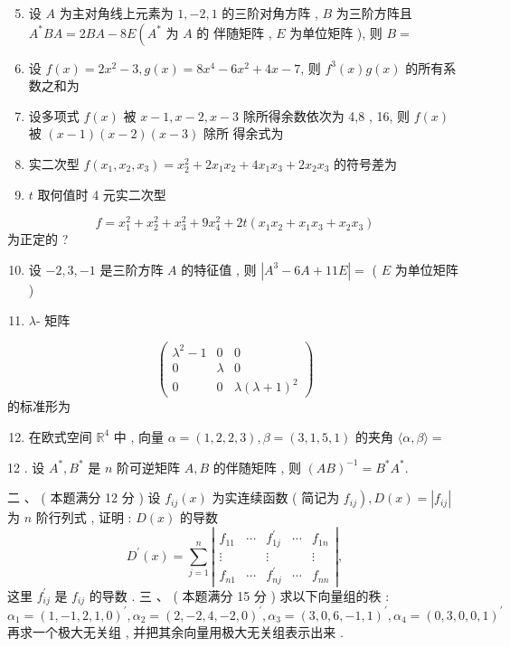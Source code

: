 \documentclass[10pt]{article}
\begin{document}
{\begin{enumerate}
  \setcounter{enumi}{4}
  \item  设  $A$  为主对角线上元素为  $1,-2,1$  的三阶对角方阵 , $B$  为三阶方阵且  $A^{*} B A=2 B A-8 E\left(A^{*}\right.$  为  $A$  的   伴随矩阵 , $E$  为单位矩阵 ),  则  $B=$

  \item  设  $f(x)=2 x^{2}-3, g(x)=8 x^{4}-6 x^{2}+4 x-7$,  则  $f^{3}(x) g(x)$  的所有系数之和为 

  \item  设多项式  $f(x)$  被  $x-1, x-2, x-3$  除所得余数依次为  4,8 , 16,  则  $f(x)$  被  $(x-1)(x-2)(x-3)$  除所   得余式为 

  \item  实二次型  $f\left(x_{1}, x_{2}, x_{3}\right)=x_{2}^{2}+2 x_{1} x_{2}+4 x_{1} x_{3}+2 x_{2} x_{3}$  的符号差为 

  \item $t$  取何值时  4  元实二次型 

\end{enumerate}
$$
f=x_{1}^{2}+x_{2}^{2}+x_{3}^{2}+9 x_{4}^{2}+2 t\left(x_{1} x_{2}+x_{1} x_{3}+x_{2} x_{3}\right)
$$
 为正定的 ?

\begin{enumerate}
  \setcounter{enumi}{9}
  \item  设  $-2,3,-1$  是三阶方阵  $A$  的特征值 ,  则  $\left|A^{3}-6 A+11 E\right|=$ ( $E$  为单位矩阵 )

  \item $\lambda$- 矩阵 

\end{enumerate}
$$
\left(\begin{array}{ccc}
\lambda^{2}-1 & 0 & 0 \\
0 & \lambda & 0 \\
0 & 0 & \lambda(\lambda+1)^{2}
\end{array}\right)
$$
 的标准形为 

\begin{enumerate}
  \setcounter{enumi}{11}
  \item  在欧式空间  $\mathbb{R}^{4}$  中 ,  向量  $\alpha=(1,2,2,3), \beta=(3,1,5,1)$  的夹角  $\langle\alpha, \beta\rangle=$
\end{enumerate}
12 .  设  $A^{*}, B^{*}$  是  $n$  阶可逆矩阵  $A, B$  的伴随矩阵 ,  则  $(A B)^{-1}=B^{*} A^{*}$.

 二 、 ( 本题满分  12  分 )  设  $f_{i j}(x)$  为实连续函数  ( 简记为  $\left.f_{i j}\right), D(x)=\left|f_{i j}\right|$  为  $n$  阶行列式 ,  证明 : $D(x)$  的导数 
$$
D^{\prime}(x)=\sum_{j=1}^{n}\left|\begin{array}{ccccc}
f_{11} & \cdots & f_{1 j}^{\prime} & \cdots & f_{1 n} \\
\vdots & & \vdots & & \vdots \\
f_{n 1} & \cdots & f_{n j}^{\prime} & \cdots & f_{n n}
\end{array}\right|,
$$
 这里  $f_{i j}^{\prime}$  是  $f_{i j}$  的导数 .  三 、 ( 本题满分  15  分 )  求以下向量组的秩 :
$$
\alpha_{1}=(1,-1,2,1,0)^{\prime}, \alpha_{2}=(2,-2,4,-2,0)^{\prime}, \alpha_{3}=(3,0,6,-1,1)^{\prime}, \alpha_{4}=(0,3,0,0,1)^{\prime}
$$
 再求一个极大无关组 ,  并把其余向量用极大无关组表示出来 .

}
\end{document}
